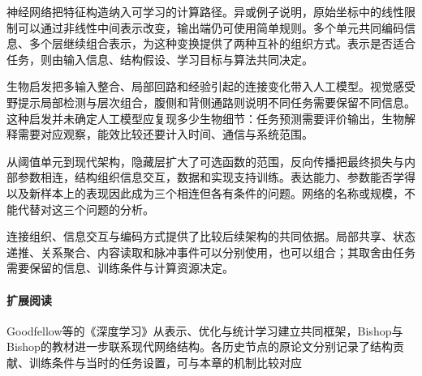 神经网络把特征构造纳入可学习的计算路径。异或例子说明，原始坐标中的线性限制可以通过非线性中间表示改变，输出端仍可使用简单规则。多个单元共同编码信息、多个层继续组合表示，为这种变换提供了两种互补的组织方式。表示是否适合任务，则由输入信息、结构假设、学习目标与算法共同决定。

生物启发把多输入整合、局部回路和经验引起的连接变化带入人工模型。视觉感受野提示局部检测与层次组合，腹侧和背侧通路则说明不同任务需要保留不同信息。这种启发并未确定人工模型应复现多少生物细节：任务预测需要评价输出，生物解释需要对应观察，能效比较还要计入时间、通信与系统范围。

从阈值单元到现代架构，隐藏层扩大了可选函数的范围，反向传播把最终损失与内部参数相连，结构组织信息交互，数据和实现支持训练。表达能力、参数能否学得以及新样本上的表现因此成为三个相连但各有条件的问题。网络的名称或规模，不能代替对这三个问题的分析。

连接组织、信息交互与编码方式提供了比较后续架构的共同依据。局部共享、状态递推、关系聚合、内容读取和脉冲事件可以分别使用，也可以组合；其取舍由任务需要保留的信息、训练条件与计算资源决定。

\paragraph{扩展阅读}
Goodfellow等的《深度学习》从表示、优化与统计学习建立共同框架，Bishop与Bishop的教材进一步联系现代网络结构。各历史节点的原论文分别记录了结构贡献、训练条件与当时的任务设置，可与本章的机制比较对应
